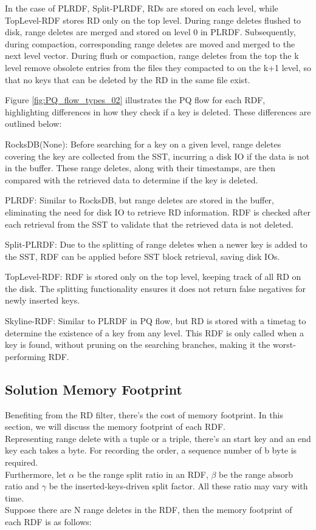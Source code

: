     In the case of PLRDF, Split-PLRDF, RDs are stored on each level, while TopLevel-RDF stores RD only on the top level. During range deletes flushed to disk, range deletes are merged and stored on level 0 in PLRDF. Subsequently, during compaction, corresponding range deletes are moved and merged to the next level vector. During flush or compaction, range deletes from the top the k level remove obsolete entries from the files they compacted to on the k+1 level, so that no keys that can be deleted by the RD in the same file exist. 

    Figure \ref{fig:PQ_flow_types_02} illustrates the PQ flow for each RDF, highlighting differences in how they check if a key is deleted. These differences are outlined below:

    RocksDB(None): Before searching for a key on a given level, range deletes covering the key are collected from the SST, incurring a disk IO if the data is not in the buffer. These range deletes, along with their timestamps, are then compared with the retrieved data to determine if the key is deleted.

    PLRDF: Similar to RocksDB, but range deletes are stored in the buffer, eliminating the need for disk IO to retrieve RD information. RDF is checked after each retrieval from the SST to validate that the retrieved data is not deleted.

    Split-PLRDF: Due to the splitting of range deletes when a newer key is added to the SST, RDF can be applied before SST block retrieval, saving disk IOs.

    TopLevel-RDF: RDF is stored only on the top level, keeping track of all RD on the disk. The splitting functionality ensures it does not return false negatives for newly inserted keys.

    Skyline-RDF: Similar to PLRDF in PQ flow, but RD is stored with a timetag to determine the existence of a key from any level. This RDF is only called when a key is found, without pruning on the searching branches, making it the worst-performing RDF.





\subsection{Solution Memory Footprint}
    Benefiting from the RD filter, there's the cost of memory footprint. In this section, we will discuss the memory footprint of each RDF. \\
    Representing range delete with a tuple or a triple, there's an start key and an end key each takes a byte. For recording the order, a sequence number of b byte is required. \\
    Furthermore, let $\alpha$ be the range split ratio in an RDF, $\beta$ be the range absorb ratio and $\gamma$ be the inserted-keys-driven split factor. All these ratio may vary with time. \\
    Suppose there are N range deletes in the RDF, then the memory footprint of each RDF is as follows: \\

